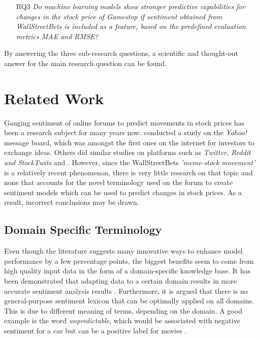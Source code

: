 \documentclass[11pt, a4paper]{article}
\begin{document}
\begin{itemize}
    \item[RQ3] \emph{Do machine learning models show stronger predictive capabilities for changes in the stock price of Gamestop if sentiment obtained from WallStreetBets is included as a feature, based on the predefined evaluation metrics MAE and RMSE?}
\end{itemize}

By answering the three sub-research questions, a scientific and thought-out answer for the main research question can be found.



\section{Related Work}
Gauging sentiment of online forums to predict movements in stock prices has been a research subject for many years now. 
\cite{das2007yahoo} conducted a study on the \emph{Yahoo!} message board, which was amongst the first ones on the internet for investors to exchange ideas.
Others did similar studies on platforms such as \emph{Twitter, Reddit and StockTwits} and \citep{gu2020twtrsentiment, anand2021WallstreetbetsAgainstWallstreet, chousa2017socialmedia}.
However, since the WallStreetBets \emph{'meme-stock movement'} is a relatively recent phenomenon, there is very little research on that topic and none that accounts for the novel
terminology used on the forum to create sentiment models which can be used to predict changes in stock prices. As a result, incorrect conclusions may be drawn.

\subsection{Domain Specific Terminology}
Even though the literature suggests many 
innovative ways to enhance model performance by a few percentage points, the biggest benefits seem to come from high quality 
input data in the form of a domain-specific knowledge base. It has been demonstrated that adapting data to a certain domain
results in more accurate sentiment analysis results \citep{park2015EfficientExtraction}.
Furthermore, it is argued that there is no general-purpose sentiment lexicon that can be optimally applied on all domains. 
This is due to different meaning of terms, depending on the domain. A good example is the word \emph{unpredictable}, 
which would be associated with negative sentiment for a car but can be a positive label for movies \citep{bo2008opinionmining}.
\end{document}
